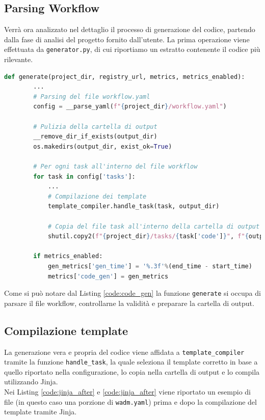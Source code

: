 \subsection{Parsing Workflow}

Verrà ora analizzato nel dettaglio il processo di generazione del codice, partendo dalla fase di analisi del progetto fornito dall'utente. La prima operazione viene effettuata da \texttt{generator.py}, di cui riportiamo un estratto contenente il codice più rilevante.
\begin{lstlisting}[language=python, caption={Generazione del codice}, captionpos=b, label={code:code_gen}]
    def generate(project_dir, registry_url, metrics, metrics_enabled):
        ...
        # Parsing del file workflow.yaml
        config = __parse_yaml(f"{project_dir}/workflow.yaml")
        
        # Pulizia della cartella di output
        __remove_dir_if_exists(output_dir)
        os.makedirs(output_dir, exist_ok=True)
        
        # Per ogni task all'interno del file workflow
        for task in config['tasks']:
            ...
            # Compilazione dei template
            template_compiler.handle_task(task, output_dir)

            # Copia del file task all'interno della cartella di output
            shutil.copy2(f"{project_dir}/tasks/{task['code']}", f"{output_dir}/{task['component_name']}/{task['code']}")
                
        if metrics_enabled:
            gen_metrics['gen_time'] = '%.3f'%(end_time - start_time)
            metrics['code_gen'] = gen_metrics
\end{lstlisting}

Come si può notare dal Listing \ref{code:code_gen} la funzione \texttt{generate} si occupa di parsare il file workflow, controllarne la validità e preparare la cartella di output. 

\subsection{Compilazione template}

La generazione vera e propria del codice viene affidata a \texttt{template\_compiler} tramite la funzione \texttt{handle\_task}, la quale seleziona il template corretto in base a quello riportato nella configurazione, lo copia nella cartella di output e lo compila utilizzando Jinja.\\
Nei Listing \ref{code:jinja_after} e \ref{code:jinja_after} viene riportato un esempio di file (in questo caso una porzione di \texttt{wadm.yaml}) prima e dopo la compilazione del template tramite Jinja.\\

